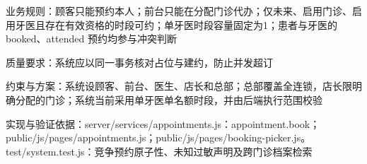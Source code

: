 \documentclass[UTF8,12pt,a4paper,fontset=none]{ctexart}
\begin{document}
业务规则：顾客只能预约本人；前台只能在分配门诊代办；仅未来、启用门诊、启用牙医且存在有效资格的时段可约；单牙医时段容量固定为1；患者与牙医的 booked、attended 预约均参与冲突判断\par
质量要求：系统应以同一事务核对占位与建约，防止并发超订\par
约束与方案：系统设顾客、前台、医生、店长和总部；总部覆盖全连锁，店长限明确分配的门诊；系统当前采用单牙医单名额时段，并由后端执行范围校验\par
实现与验证依据：server/\allowbreak{}services/\allowbreak{}appointments.\allowbreak{}js：appointment.\allowbreak{}book；public/\allowbreak{}js/\allowbreak{}pages/\allowbreak{}appointments.\allowbreak{}js；public/\allowbreak{}js/\allowbreak{}pages/\allowbreak{}booking-picker.\allowbreak{}js。test/\allowbreak{}system.\allowbreak{}test.\allowbreak{}js：竞争预约原子性、未知过敏声明及跨门诊档案检索\par
{}
\end{document}
